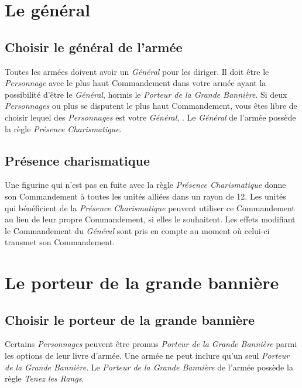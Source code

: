 \section{Le général}

\subsection{Choisir le général de l'armée}

Toutes les armées doivent avoir un \emph{Général} pour les diriger. Il doit être le \emph{Personnage} avec le plus haut Commandement dans votre armée ayant la possibilité d'être le \emph{Général}, hormis le \emph{Porteur de la Grande Bannière}. Si deux \emph{Personnages} ou plus se disputent le plus haut Commandement, vous êtes libre de choisir lequel des \emph{Personnages} est votre \emph{Général}, . Le \emph{Général} de l'armée possède la règle \emph{Présence Charismatique}.

\subsection{Présence charismatique}

Une figurine qui n'est pas en fuite avec la règle \emph{Présence Charismatique} donne son Commandement à toutes les unités alliées dans un rayon de 12{\pouce}. Les unités qui bénéficient de la \emph{Présence Charismatique} peuvent utiliser ce Commandement au lieu de leur propre Commandement, si elles le souhaitent. Les effets modifiant le Commandement du \emph{Général} sont pris en compte au moment où celui-ci transmet son Commandement.

\section{Le porteur de la grande bannière}

\subsection{Choisir le porteur de la grande bannière}

Certains \emph{Personnages} peuvent être promus \emph{Porteur de la Grande Bannière} parmi les options de leur livre d'armée. Une armée ne peut inclure qu'un seul \emph{Porteur de la Grande Bannière}. Le \emph{Porteur de la Grande Bannière} de l'armée possède la règle \emph{Tenez les Rangs}.

